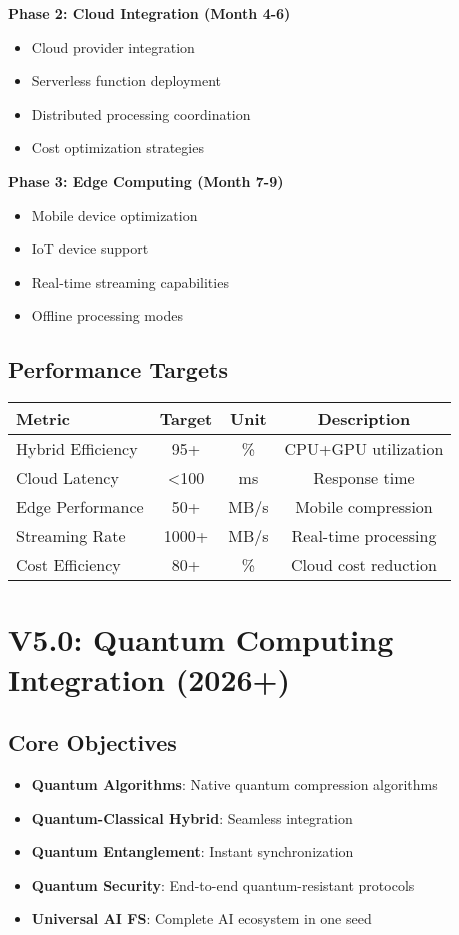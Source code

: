 \documentclass[12pt,a4paper]{article}
\begin{document}
\textbf{Phase 2: Cloud Integration (Month 4-6)}
\begin{itemize}
    \item Cloud provider integration
    \item Serverless function deployment
    \item Distributed processing coordination
    \item Cost optimization strategies
\end{itemize}

\textbf{Phase 3: Edge Computing (Month 7-9)}
\begin{itemize}
    \item Mobile device optimization
    \item IoT device support
    \item Real-time streaming capabilities
    \item Offline processing modes
\end{itemize}

\subsection{Performance Targets}
\begin{center}
\begin{tabular}{|l|c|c|c|}
\hline
\textbf{Metric} & \textbf{Target} & \textbf{Unit} & \textbf{Description} \\
\hline
Hybrid Efficiency & 95+ & \% & CPU+GPU utilization \\
Cloud Latency & <100 & ms & Response time \\
Edge Performance & 50+ & MB/s & Mobile compression \\
Streaming Rate & 1000+ & MB/s & Real-time processing \\
Cost Efficiency & 80+ & \% & Cloud cost reduction \\
\hline
\end{tabular}
\end{center}

\newpage

\section{V5.0: Quantum Computing Integration (2026+)}

\subsection{Core Objectives}
\begin{itemize}
    \item \textbf{Quantum Algorithms}: Native quantum compression algorithms
    \item \textbf{Quantum-Classical Hybrid}: Seamless integration
    \item \textbf{Quantum Entanglement}: Instant synchronization
    \item \textbf{Quantum Security}: End-to-end quantum-resistant protocols
    \item \textbf{Universal AI FS}: Complete AI ecosystem in one seed
\end{itemize}
\end{document}
